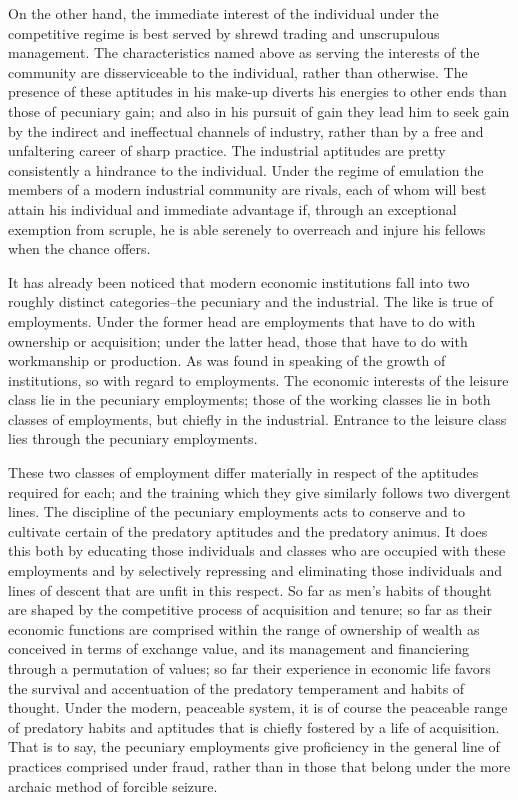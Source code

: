 \documentclass[12pt]{report}
\begin{document}
On the other hand, the immediate interest of the individual under the
competitive regime is best served by shrewd trading and unscrupulous
management. The characteristics named above as serving the interests
of the community are disserviceable to the individual, rather than
otherwise. The presence of these aptitudes in his make-up diverts his
energies to other ends than those of pecuniary gain; and also in
his pursuit of gain they lead him to seek gain by the indirect and
ineffectual channels of industry, rather than by a free and unfaltering
career of sharp practice. The industrial aptitudes are pretty
consistently a hindrance to the individual. Under the regime of
emulation the members of a modern industrial community are rivals, each
of whom will best attain his individual and immediate advantage if,
through an exceptional exemption from scruple, he is able serenely to
overreach and injure his fellows when the chance offers.

It has already been noticed that modern economic institutions fall into
two roughly distinct categories--the pecuniary and the industrial. The
like is true of employments. Under the former head are employments that
have to do with ownership or acquisition; under the latter head, those
that have to do with workmanship or production. As was found in speaking
of the growth of institutions, so with regard to employments.
The economic interests of the leisure class lie in the pecuniary
employments; those of the working classes lie in both classes of
employments, but chiefly in the industrial. Entrance to the leisure
class lies through the pecuniary employments.

These two classes of employment differ materially in respect of the
aptitudes required for each; and the training which they give similarly
follows two divergent lines. The discipline of the pecuniary employments
acts to conserve and to cultivate certain of the predatory aptitudes and
the predatory animus. It does this both by educating those individuals
and classes who are occupied with these employments and by selectively
repressing and eliminating those individuals and lines of descent that
are unfit in this respect. So far as men's habits of thought are shaped
by the competitive process of acquisition and tenure; so far as their
economic functions are comprised within the range of ownership of
wealth as conceived in terms of exchange value, and its management and
financiering through a permutation of values; so far their experience
in economic life favors the survival and accentuation of the predatory
temperament and habits of thought. Under the modern, peaceable system,
it is of course the peaceable range of predatory habits and aptitudes
that is chiefly fostered by a life of acquisition. That is to say, the
pecuniary employments give proficiency in the general line of practices
comprised under fraud, rather than in those that belong under the more
archaic method of forcible seizure.
\end{document}
